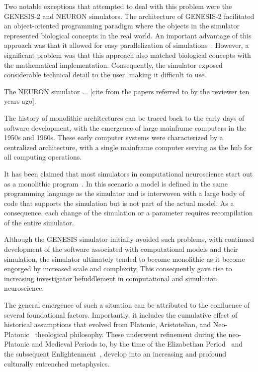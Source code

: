 \documentclass[11pt,3p,twocolumn]{JMN}
\begin{document}
Two notable exceptions that attempted to deal with this problem were the GENESIS-2 and NEURON simulators.  The architecture of GENESIS-2 facilitated an object-oriented programming paradigm where the objects in the simulator represented biological concepts in the real world. An important advantage of this approach was that it allowed for easy parallelization of simulations~\citep{cornelis07a}. However, a significant problem was that this approach also matched biological concepts with the mathematical implementation. Consequently, the simulator exposed considerable technical detail to the user, making it difficult to use.

The NEURON simulator ... [cite from the papers referred to by the reviewer ten years ago].

The history of monolithic architectures can be traced back to the early days of software development, with the emergence of large mainframe computers in the 1950s and 1960s. These early computer systems were characterized by a centralized architecture, with a single mainframe computer serving as the hub for all computing operations.

It has been claimed that most simulators in computational neuroscience start out as a monolithic program~\citep{cannon07:_inter}. In this scenario a model is defined in the same programming language as the simulator and is interwoven with a large body of code that supports the simulation but is not part of the actual model. As a consequence, each change of the simulation or a parameter requires recompilation of the entire simulator.

Although the GENESIS simulator initially avoided such problems, with continued development of the software associated with computational models and their simulation, the simulator ultimately tended to become monolithic as it become engorged by increased scale and complexity, This consequently gave rise to increasing investigator befuddlement in computational and simulation neuroscience.

The general emergence of such a situation can be attributed to the confluence of several foundational factors. Importantly, it includes the cumulative effect of historical assumptions that evolved from Platonic, Aristotelian, and Neo-Platonic~\citep{parker99} theological philosophy. These underwent refinement during the neo-Platonic and Medieval Periods to, by the time of the Elizabethan Period~\citep{tillyard17} and the subsequent Enlightenment~\citep{lovejoy48}, develop into an increasing and profound culturally entrenched metaphysics.
\end{document}
